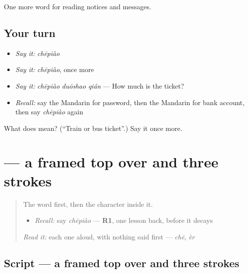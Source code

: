 \begin{grammarlens}[title={What you've built}]
One more word for reading notices and messages.
\end{grammarlens}

\subsection*{Your turn}
\begin{itemize}
\raggedright
  \item \emph{Say it:} \emph{chēpiào}
  \item \emph{Say it:} \emph{chēpiào}, once more
  \item \emph{Say it:} \emph{chēpiào duōshao qián} — How much is the ticket?
  \item \emph{Recall:} say the Mandarin for password, then the Mandarin for bank account, then say \emph{chēpiào} again
\end{itemize}

\begin{tcolorbox}[breakable,colback=teal!4,colframe=teal!35!black,title={Before you move on}]
What does  mean? (\textquotedblleft{}Train or bus ticket\textquotedblright{}.) Say it once more.
\end{tcolorbox}
\section[\texorpdfstring{\zh{票} (piào)}{票 (piào)}]{ — a framed top over  and three strokes}

\label{lesson:ZH-W196-piao-ticket}



\begin{quote}
The word first, then the character inside it.

\begin{itemize}
\raggedright
  \item \emph{Recall:} say \emph{chēpiào} — \textbf{R1}, one lesson back, before it decays
\end{itemize}

\begin{quote}
 
\end{quote}

\emph{Read it:} each one aloud, with nothing said first — \emph{chē}, \emph{èr}
\end{quote}

\subsection*{Script — a framed top over  and three strokes}

